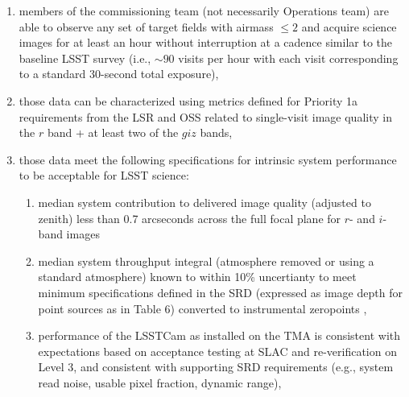 \documentclass[SE,authoryear,toc]{lsstdoc}
\begin{document}
\begin{enumerate}
  \item members of the commissioning team (not necessarily Operations team) are able to observe any set of target fields with airmass $\leq 2$ and acquire science images for at least an hour without interruption at a cadence similar to the baseline LSST survey (i.e., $\sim90$ visits per hour with each visit corresponding to a standard 30-second total exposure),
  \item those data can be characterized using metrics defined for Priority 1a requirements from the LSR  and OSS  related to single-visit image quality in the $r$ band + at least two of the $giz$ bands,
  \item those data meet the following specifications for intrinsic system performance to be acceptable for LSST science:
  \begin{enumerate}
    \item median system contribution to delivered image quality (adjusted to zenith) less than 0.7 arcseconds across the full focal plane for $r$- and $i$-band images
    \item median system throughput integral (atmosphere removed or using a standard atmosphere) known to within 10\% uncertianty to meet minimum specifications defined in the SRD (expressed as image depth for point sources as in Table 6) converted to instrumental zeropoints ,
    \item performance of the LSSTCam as installed on the TMA is consistent with expectations based on acceptance testing at SLAC and re-verification on Level 3, and consistent with supporting SRD requirements (e.g., system read noise, usable pixel fraction, dynamic range),

\end{enumerate}
\end{enumerate}
\end{document}
